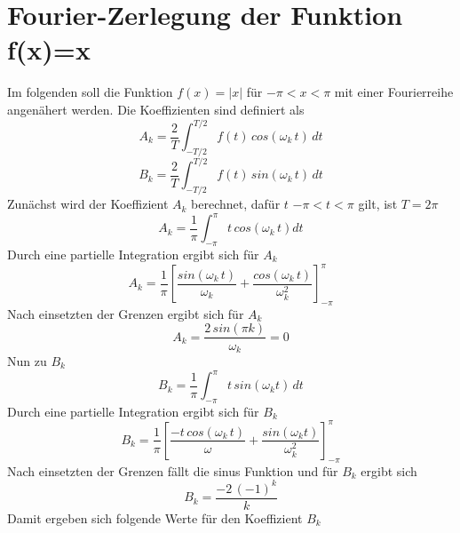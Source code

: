\section{Fourier-Zerlegung der Funktion f(x)=x}
    Im folgenden soll die Funktion $f(x)=|x|$ für $-\pi < x < \pi$ mit einer Fourierreihe angenähert werden.
    Die Koeffizienten sind definiert als
\newpage
\begin{equation}
  A_k=\frac{2}{T} \int_{-T/2}^{T/2} f(t) \, cos(\omega_k \, t) \,  dt
\end{equation}
\begin{equation}
  B_k=\frac{2}{T} \int_{-T/2}^{T/2} f(t) \, sin(\omega_k \, t) \, dt
\end{equation}
  Zunächst wird der Koeffizient $A_k$ berechnet, dafür $t$  $-\pi < t < \pi$ gilt, ist $T = 2\pi$
\begin{equation}
  A_k = \frac{1}{\pi} \int_{-\pi}^{\pi} t \, cos(\omega_k\, t) dt
\end{equation}
  Durch eine partielle Integration ergibt sich für $A_k$
\begin{equation}
  A_k= \frac{1}{\pi} \left [\frac{sin(\omega_k \, t)}{\omega_k} + \frac{cos(\omega_k \, t)}{\omega_k^2}  \right]_{-\pi}^{\pi} 
\end{equation}
  Nach einsetzten der Grenzen ergibt sich für $A_k$
\begin{equation}
  A_k = \frac{2 \, sin(\pi k)}{\omega_k} = 0
\end{equation}
  Nun zu $B_k$
\begin{equation}
  B_k = \frac{1}{\pi} \int_{-\pi}^{\pi} t \, sin (\omega_k t) \, dt
\end{equation}
  Durch eine partielle Integration ergibt sich für $B_k$
\begin{equation}
  B_k = \frac{1}{\pi} \left [\frac{- t \, cos(\omega_k \,  t)}{\omega} + \frac{sin(\omega_k t)}{\omega_k^2}\right]_{-\pi}^{\pi} 
\end{equation}
  Nach einsetzten der Grenzen fällt die sinus Funktion und für $B_k$ ergibt sich
\begin{equation}
  B_k = \frac{-2 \, (-1)^k}{k}
\end{equation}
Damit ergeben sich folgende Werte für den Koeffizient $B_k$
